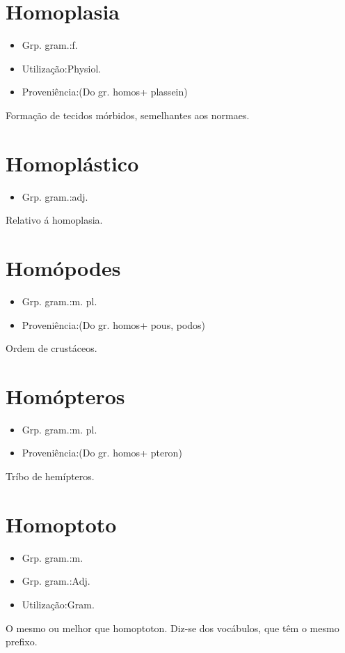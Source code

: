 \documentclass{article}
\begin{document}
\section{Homoplasia}
\begin{itemize}
\item {Grp. gram.:f.}
\end{itemize}
\begin{itemize}
\item {Utilização:Physiol.}
\end{itemize}
\begin{itemize}
\item {Proveniência:(Do gr. \textunderscore homos\textunderscore  + \textunderscore plassein\textunderscore )}
\end{itemize}
Formação de tecidos mórbidos, semelhantes aos normaes.
\section{Homoplástico}
\begin{itemize}
\item {Grp. gram.:adj.}
\end{itemize}
Relativo á homoplasia.
\section{Homópodes}
\begin{itemize}
\item {Grp. gram.:m. pl.}
\end{itemize}
\begin{itemize}
\item {Proveniência:(Do gr. \textunderscore homos\textunderscore  + \textunderscore pous\textunderscore , \textunderscore podos\textunderscore )}
\end{itemize}
Ordem de crustáceos.
\section{Homópteros}
\begin{itemize}
\item {Grp. gram.:m. pl.}
\end{itemize}
\begin{itemize}
\item {Proveniência:(Do gr. \textunderscore homos\textunderscore  + \textunderscore pteron\textunderscore )}
\end{itemize}
Tríbo de hemípteros.
\section{Homoptoto}
\begin{itemize}
\item {Grp. gram.:m.}
\end{itemize}
\begin{itemize}
\item {Grp. gram.:Adj.}
\end{itemize}
\begin{itemize}
\item {Utilização:Gram.}
\end{itemize}
O mesmo ou melhor que \textunderscore homoptoton\textunderscore .
Diz-se dos vocábulos, que têm o mesmo prefixo.
\end{document}
